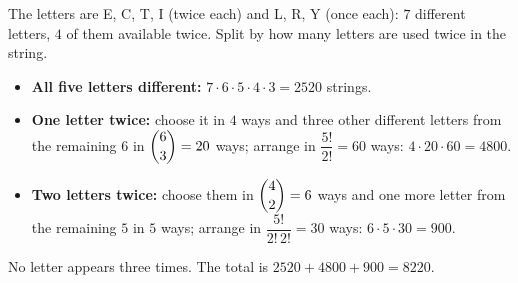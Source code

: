 The letters are E, C, T, I (twice each) and L, R, Y (once each): $7$ different letters, $4$ of them available twice. Split by how many letters are used twice in the string.
\begin{itemize}
\item \textbf{All five letters different:} $7\cdot6\cdot5\cdot4\cdot3=2520$ strings.
\item \textbf{One letter twice:} choose it in $4$ ways and three other different letters from the remaining $6$ in $\dbinom63=20$ ways; arrange in $\dfrac{5!}{2!}=60$ ways: $4\cdot20\cdot60=4800$.
\item \textbf{Two letters twice:} choose them in $\dbinom42=6$ ways and one more letter from the remaining $5$ in $5$ ways; arrange in $\dfrac{5!}{2!\,2!}=30$ ways: $6\cdot5\cdot30=900$.
\end{itemize}
No letter appears three times. The total is $2520+4800+900=\boxed{8220}$.
